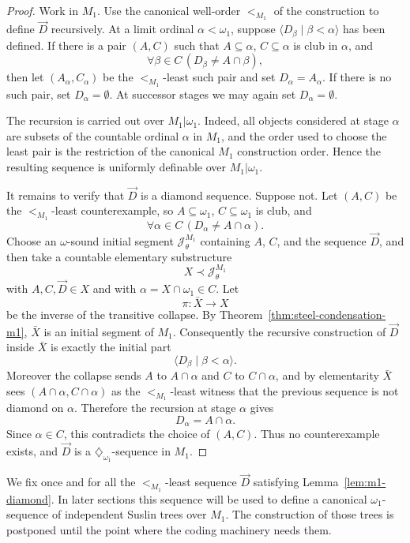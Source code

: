\documentclass[a4paper,11pt]{article}
\begin{document}
\begin{proof}
Work in $M_1$.  Use the canonical well-order $<_{M_1}$ of the construction to define $\vec D$ recursively.  At a limit ordinal $\alpha<\omega_1$, suppose $\langle D_\beta\mid\beta<\alpha\rangle$ has been defined.  If there is a pair $(A,C)$ such that $A\subseteq\alpha$, $C\subseteq\alpha$ is club in $\alpha$, and
\[
   \forall\beta\in C\, (D_\beta\neq A\cap\beta),
\]
then let $(A_\alpha,C_\alpha)$ be the $<_{M_1}$-least such pair and set $D_\alpha=A_\alpha$.  If there is no such pair, set $D_\alpha=\emptyset$.  At successor stages we may again set $D_\alpha=\emptyset$.

The recursion is carried out over $M_1|\omega_1$.  Indeed, all objects considered at stage $\alpha$ are subsets of the countable ordinal $\alpha$ in $M_1$, and the order used to choose the least pair is the restriction of the canonical $M_1$ construction order.  Hence the resulting sequence is uniformly definable over $M_1|\omega_1$.

It remains to verify that $\vec D$ is a diamond sequence.  Suppose not.  Let $(A,C)$ be the $<_{M_1}$-least counterexample, so $A\subseteq\omega_1$, $C\subseteq\omega_1$ is club, and
\[
   \forall\alpha\in C\,(D_\alpha\neq A\cap\alpha).
\]
Choose an $\omega$-sound initial segment $\mathcal J^{M_1}_\theta$ containing $A$, $C$, and the sequence $\vec D$, and then take a countable elementary substructure
\[
   X\prec \mathcal J^{M_1}_\theta
\]
with $A,C,\vec D\in X$ and with $\alpha=X\cap\omega_1\in C$.  Let
\[
   \pi:\bar X\rightarrow X
\]
be the inverse of the transitive collapse.  By Theorem~\ref{thm:steel-condensation-m1}, $\bar X$ is an initial segment of $M_1$.  Consequently the recursive construction of $\vec D$ inside $\bar X$ is exactly the initial part
\[
   \langle D_\beta\mid\beta<\alpha\rangle.
\]
Moreover the collapse sends $A$ to $A\cap\alpha$ and $C$ to $C\cap\alpha$, and by elementarity $\bar X$ sees $(A\cap\alpha,C\cap\alpha)$ as the $<_{M_1}$-least witness that the previous sequence is not diamond on $\alpha$.  Therefore the recursion at stage $\alpha$ gives
\[
   D_\alpha=A\cap\alpha.
\]
Since $\alpha\in C$, this contradicts the choice of $(A,C)$.  Thus no counterexample exists, and $\vec D$ is a $\diamondsuit_{\omega_1}$-sequence in $M_1$.
\end{proof}

We fix once and for all the $<_{M_1}$-least sequence $\vec D$ satisfying Lemma~\ref{lem:m1-diamond}.  In later sections this sequence will be used to define a canonical $\omega_1$-sequence of independent Suslin trees over $M_1$.  The construction of those trees is postponed until the point where the coding machinery needs them.
\end{document}
